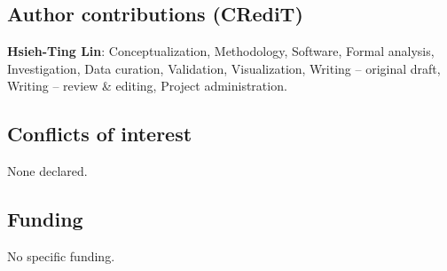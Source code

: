 \documentclass[11pt,a4paper]{article}
\begin{document}
\subsection*{Author contributions (CRediT)}
\textbf{Hsieh-Ting Lin}: Conceptualization, Methodology, Software, Formal analysis, Investigation, Data curation, Validation, Visualization, Writing -- original draft, Writing -- review \& editing, Project administration.

\subsection*{Conflicts of interest}
None declared.

\subsection*{Funding}
No specific funding.



\end{document}

